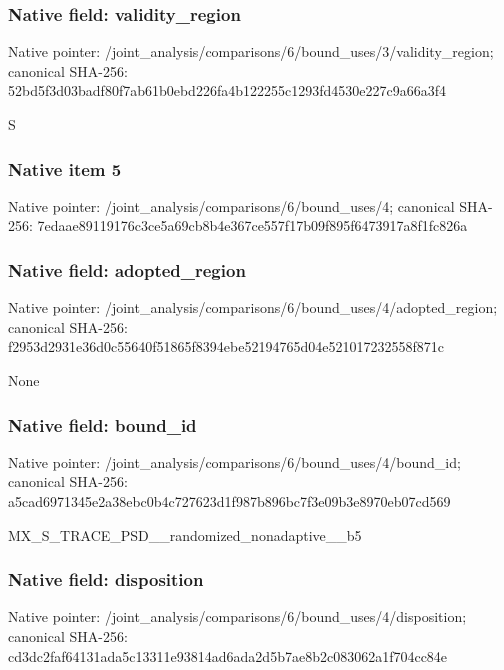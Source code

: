 \documentclass[10pt,a4paper]{article}
\begin{document}
\subsubsection{Native field: validity\_\allowbreak{}region}
Native pointer: /joint\_\allowbreak{}analysis/comparisons/6/bound\_\allowbreak{}uses/3/validity\_\allowbreak{}region; canonical SHA-256: 52bd5f3d03badf80f7ab61b0ebd226fa4b122255c1293fd4530e227c9a66a3f4

\begingroup\raggedright\sloppy S\par\endgroup

\subsubsection{Native item 5}
Native pointer: /joint\_\allowbreak{}analysis/comparisons/6/bound\_\allowbreak{}uses/4; canonical SHA-256: 7edaae89119176c3ce5a69cb8b4e367ce557f17b09f895f6473917a8f1fc826a

\subsubsection{Native field: adopted\_\allowbreak{}region}
Native pointer: /joint\_\allowbreak{}analysis/comparisons/6/bound\_\allowbreak{}uses/4/adopted\_\allowbreak{}region; canonical SHA-256: f2953d2931e36d0c55640f51865f8394ebe52194765d04e521017232558f871c

\begingroup\raggedright\sloppy None\par\endgroup

\subsubsection{Native field: bound\_\allowbreak{}id}
Native pointer: /joint\_\allowbreak{}analysis/comparisons/6/bound\_\allowbreak{}uses/4/bound\_\allowbreak{}id; canonical SHA-256: a5cad6971345e2a38ebc0b4c727623d1f987b896bc7f3e09b3e8970eb07cd569

\begingroup\raggedright\sloppy MX\_\allowbreak{}S\_\allowbreak{}TRACE\_\allowbreak{}PSD\_\allowbreak{}\_\allowbreak{}randomized\_\allowbreak{}nonadaptive\_\allowbreak{}\_\allowbreak{}b5\par\endgroup

\subsubsection{Native field: disposition}
Native pointer: /joint\_\allowbreak{}analysis/comparisons/6/bound\_\allowbreak{}uses/4/disposition; canonical SHA-256: cd3dc2faf64131ada5c13311e93814ad6ada2d5b7ae8b2c083062a1f704cc84e
\end{document}
